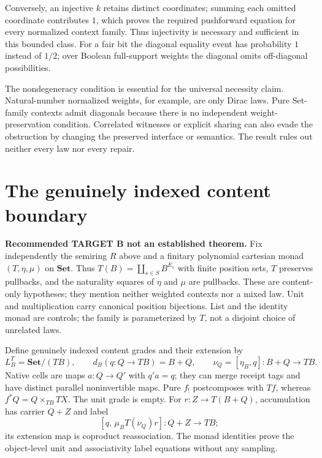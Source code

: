 \documentclass[11pt,a4paper]{article}
\newcommand{\Set}{\mathbf{Set}}
\newcommand{\status}[1]{\textbf{#1.}}
\begin{document}
Conversely, an injective $k$ retains distinct coordinates; summing each
omitted coordinate contributes $1$, which proves the required pushforward
equation for every normalized context family. Thus injectivity is necessary
and sufficient in this bounded class. For a fair bit the diagonal equality
event has probability $1$ instead of $1/2$; over Boolean full-support
weights the diagonal omits off-diagonal possibilities.

The nondegeneracy condition is essential for the universal necessity claim.
Natural-number normalized weights, for example, are only Dirac laws.
Pure Set-family contexts admit diagonals because there is no independent
weight-preservation condition. Correlated witnesses or explicit sharing
can also evade the obstruction by changing the preserved interface or
semantics. The result rules out neither every law nor every repair.

\section{The genuinely indexed content boundary}
\label{sec:indexed}
\status{Recommended TARGET B not an established theorem}
Fix independently the semiring $R$ above and a finitary polynomial cartesian
monad $(T,\eta,\mu)$ on $\Set$. Thus $T(B)=\coprod_{s\in S}B^{E_s}$
with finite position sets, $T$ preserves pullbacks, and the naturality squares
of $\eta$ and $\mu$ are pullbacks. These are content-only hypotheses; they
mention neither weighted contexts nor a mixed law. Unit and multiplication
carry canonical position bijections. List and the identity monad are controls;
the family is parameterized by $T$, not a disjoint choice of unrelated laws.

Define genuinely indexed content grades and their extension by
\[
 L^T_B=\Set/(TB),\qquad d_B(q:Q\to TB)=B+Q,\qquad
 \nu_Q=[\eta_B,q]:B+Q\longrightarrow TB.
\]
Native cells are maps $a:Q\to Q'$ with $q'a=q$; they can merge receipt tags
and have distinct parallel noninvertible maps. Pure $f_!$ postcomposes with
$Tf$, whereas $f^*Q=Q\times_{TB}TX$. The unit grade is empty. For
$r:Z\to T(B+Q)$, accumulation has carrier $Q+Z$ and label
\[
 [q,\,\mu_BT(\nu_Q)r]:Q+Z\longrightarrow TB;
\]
its extension map is coproduct reassociation. The monad identities prove the
object-level unit and associativity label equations without any sampling.
\end{document}
